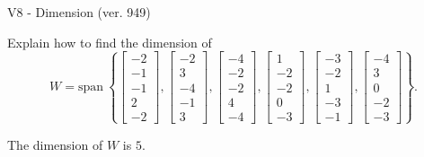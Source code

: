 \begin{exercise}
  \begin{exerciseTitle}V8 - Dimension (ver. 949)\end{exerciseTitle}
  \begin{exerciseStatement}
    Explain how to find the dimension of 
\[W=\mathrm{span}\ \left\{\left[\begin{array}{r}
-2 \\
-1 \\
-1 \\
2 \\
-2
\end{array}\right] , \left[\begin{array}{r}
-2 \\
3 \\
-4 \\
-1 \\
3
\end{array}\right] , \left[\begin{array}{r}
-4 \\
-2 \\
-2 \\
4 \\
-4
\end{array}\right] , \left[\begin{array}{r}
1 \\
-2 \\
-2 \\
0 \\
-3
\end{array}\right] , \left[\begin{array}{r}
-3 \\
-2 \\
1 \\
-3 \\
-1
\end{array}\right] , \left[\begin{array}{r}
-4 \\
3 \\
0 \\
-2 \\
-3
\end{array}\right]\right\}.\]



  \end{exerciseStatement}
  \begin{exerciseAnswer}
   The dimension of \(W\) is  \(5\).
  


  \end{exerciseAnswer}
\end{exercise}